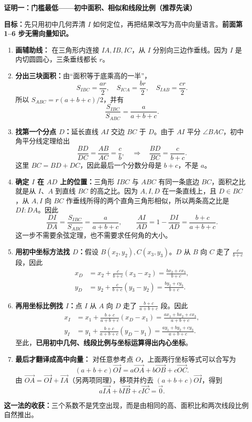 \begin{proofbox}
\textbf{证明一：门槛最低——初中面积、相似和线段比例（推荐先读）}

\textbf{目标：}先只用初中几何弄清 $I$ 如何定位，再把结果改写为高中向量语言。\textbf{前面第 1--6 步无需向量知识。}
\begin{enumerate}
\item \textbf{画辅助线：} 在三角形内连接 $IA,IB,IC$，从 $I$ 分别向三边作垂线。因为 $I$ 是内切圆圆心，三条垂线都长 $r$。
\item \textbf{分出三块面积：}由“面积等于底乘高的一半”，
\[
S_{IBC}=\frac{ar}{2},\quad S_{ICA}=\frac{br}{2},\quad S_{IAB}=\frac{cr}{2}.
\]
所以 $S_{ABC}=r(a+b+c)/2$，并有
\[
\frac{S_{IBC}}{S_{ABC}}=\frac{a}{a+b+c}.
\]
\item \textbf{找第一个分点 $D$：}延长直线 $AI$ 交边 $BC$ 于 $D$。由于 $AI$ 平分 $\angle BAC$，初中角平分线定理给出
\[
\frac{BD}{DC}=\frac{AB}{AC}=\frac cb,
\quad\Longrightarrow\quad \frac{BD}{BC}=\frac{c}{b+c}.
\]
这里 $BC=BD+DC$，因此最后一个分数分母是 $b+c$，不是 $a$。
\item \textbf{确定 $I$ 在 $AD$ 上的位置：}三角形 $IBC$ 与 $ABC$ 有同一条底边 $BC$，面积之比就是从 $I$、$A$ 到直线 $BC$ 的高之比。因为 $A,I,D$ 在一条直线上，且 $D\in BC$，从 $A,I$ 向 $BC$ 作垂线所得的两个直角三角形相似，所以两条高之比是 $DI:DA$。因此
\[
\frac{DI}{DA}=\frac{S_{IBC}}{S_{ABC}}=\frac{a}{a+b+c},
\qquad
\frac{AI}{AD}=1-\frac{DI}{AD}=\frac{b+c}{a+b+c}.
\]
这一步不需要余弦定理，也不需要求任何角的大小。
\item \textbf{用初中坐标方法找 $D$：}假设 $B(x_2,y_2),C(x_3,y_3)$。$D$ 从 $B$ 向 $C$ 走了 $\frac{c}{b+c}$ 段，因此
\[
\begin{aligned}
x_D&=x_2+\frac{c}{b+c}(x_3-x_2)=\frac{bx_2+cx_3}{b+c},\\
y_D&=y_2+\frac{c}{b+c}(y_3-y_2)=\frac{by_2+cy_3}{b+c}.
\end{aligned}
\]
\item \textbf{再用坐标比例找 $I$：}点 $I$ 从 $A$ 向 $D$ 走了 $\frac{b+c}{a+b+c}$ 段。因此
\[
\begin{aligned}
x_I&=x_1+\frac{b+c}{a+b+c}(x_D-x_1)
=\frac{ax_1+bx_2+cx_3}{a+b+c},\\
y_I&=y_1+\frac{b+c}{a+b+c}(y_D-y_1)
=\frac{ay_1+by_2+cy_3}{a+b+c}.
\end{aligned}
\]
至此，\textbf{已用初中几何、线段比例与坐标运算得出内心坐标}。
\item \textbf{最后才翻译成高中向量：} 对任意参考点 $O$，上面两行坐标等式可以合写为
\[
(a+b+c)\vec{OI}=a\vec{OA}+b\vec{OB}+c\vec{OC}.
\]
由 $\vec{OA}=\vec{OI}+\vec{IA}$（另两项同理），移项并约去 $(a+b+c)\vec{OI}$，得到
\[
\boxed{a\vec{IA}+b\vec{IB}+c\vec{IC}=\vec0}.
\]
\end{enumerate}
\textbf{这一法的收获：}三个系数不是凭空出现，而是由相同的高、面积比和两次线段比例自然推出。
\end{proofbox}

